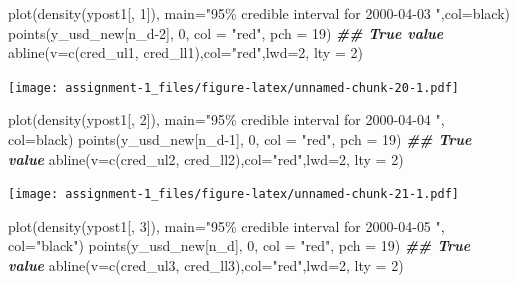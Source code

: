 \documentclass[
]{article}
\newenvironment{Shaded}{\begin{snugshade}}{\end{snugshade}}
\newcommand{\AttributeTok}[1]{\textcolor[rgb]{0.77,0.63,0.00}{#1}}
\newcommand{\DecValTok}[1]{\textcolor[rgb]{0.00,0.00,0.81}{#1}}
\newcommand{\DocumentationTok}[1]{\textcolor[rgb]{0.56,0.35,0.01}{\textbf{\textit{#1}}}}
\newcommand{\FunctionTok}[1]{\textcolor[rgb]{0.00,0.00,0.00}{#1}}
\newcommand{\NormalTok}[1]{#1}
\newcommand{\StringTok}[1]{\textcolor[rgb]{0.31,0.60,0.02}{#1}}
\begin{document}
\begin{Shaded}
\begin{Highlighting}[]
\FunctionTok{plot}\NormalTok{(}\FunctionTok{density}\NormalTok{(ypost1[, }\DecValTok{1}\NormalTok{]), }\AttributeTok{main=}\StringTok{"95\% credible interval for 2000{-}04{-}03 "}\NormalTok{,}\AttributeTok{col=}\StringTok{\textquotesingle{}black\textquotesingle{}}\NormalTok{)}
\FunctionTok{points}\NormalTok{(y\_usd\_new[n\_d}\DecValTok{{-}2}\NormalTok{], }\DecValTok{0}\NormalTok{, }\AttributeTok{col =} \StringTok{"red"}\NormalTok{, }\AttributeTok{pch =} \DecValTok{19}\NormalTok{) }\DocumentationTok{\#\# True value}
\FunctionTok{abline}\NormalTok{(}\AttributeTok{v=}\FunctionTok{c}\NormalTok{(cred\_ul1, cred\_ll1),}\AttributeTok{col=}\StringTok{"red"}\NormalTok{,}\AttributeTok{lwd=}\DecValTok{2}\NormalTok{, }\AttributeTok{lty =} \DecValTok{2}\NormalTok{)}
\end{Highlighting}
\end{Shaded}

\texttt{[image: assignment-1\_files/figure-latex/unnamed-chunk-20-1.pdf]}

\begin{Shaded}
\begin{Highlighting}[]
\FunctionTok{plot}\NormalTok{(}\FunctionTok{density}\NormalTok{(ypost1[, }\DecValTok{2}\NormalTok{]), }\AttributeTok{main=}\StringTok{"95\% credible interval for 2000{-}04{-}04 "}\NormalTok{, }\AttributeTok{col=}\StringTok{\textquotesingle{}black\textquotesingle{}}\NormalTok{)}
\FunctionTok{points}\NormalTok{(y\_usd\_new[n\_d}\DecValTok{{-}1}\NormalTok{], }\DecValTok{0}\NormalTok{, }\AttributeTok{col =} \StringTok{"red"}\NormalTok{, }\AttributeTok{pch =} \DecValTok{19}\NormalTok{) }\DocumentationTok{\#\# True value}
\FunctionTok{abline}\NormalTok{(}\AttributeTok{v=}\FunctionTok{c}\NormalTok{(cred\_ul2, cred\_ll2),}\AttributeTok{col=}\StringTok{"red"}\NormalTok{,}\AttributeTok{lwd=}\DecValTok{2}\NormalTok{, }\AttributeTok{lty =} \DecValTok{2}\NormalTok{)}
\end{Highlighting}
\end{Shaded}

\texttt{[image: assignment-1\_files/figure-latex/unnamed-chunk-21-1.pdf]}

\begin{Shaded}
\begin{Highlighting}[]
\FunctionTok{plot}\NormalTok{(}\FunctionTok{density}\NormalTok{(ypost1[, }\DecValTok{3}\NormalTok{]), }\AttributeTok{main=}\StringTok{"95\% credible interval for 2000{-}04{-}05 "}\NormalTok{, }\AttributeTok{col=}\StringTok{"black"}\NormalTok{)}
\FunctionTok{points}\NormalTok{(y\_usd\_new[n\_d], }\DecValTok{0}\NormalTok{, }\AttributeTok{col =} \StringTok{"red"}\NormalTok{, }\AttributeTok{pch =} \DecValTok{19}\NormalTok{) }\DocumentationTok{\#\# True value}
\FunctionTok{abline}\NormalTok{(}\AttributeTok{v=}\FunctionTok{c}\NormalTok{(cred\_ul3, cred\_ll3),}\AttributeTok{col=}\StringTok{"red"}\NormalTok{,}\AttributeTok{lwd=}\DecValTok{2}\NormalTok{, }\AttributeTok{lty =} \DecValTok{2}\NormalTok{)}
\end{Highlighting}
\end{Shaded}
\end{document}
